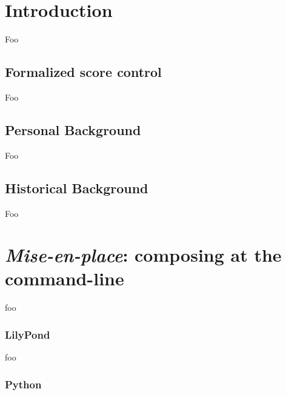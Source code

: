 \chapter{Introduction}

Foo

\section{Formalized score control}

Foo

\section{Personal Background}

Foo

\section{Historical Background}

Foo

\chapter{\emph{Mise-en-place}: composing at the command-line}

foo

\subsection{LilyPond}

foo

\subsection{Python}

